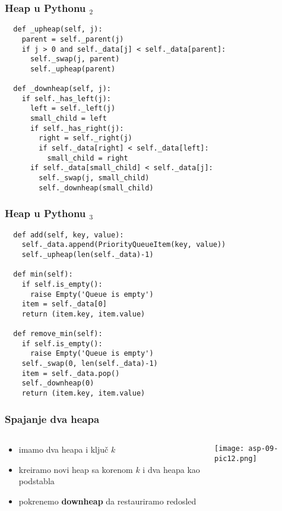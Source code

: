\documentclass[compress]{beamer}
\begin{document}
\begin{frame}
  \frametitle{Heap u Pythonu $_2$}
\begin{verbatim}
  def _upheap(self, j):
    parent = self._parent(j)
    if j > 0 and self._data[j] < self._data[parent]:
      self._swap(j, parent)
      self._upheap(parent)
  
  def _downheap(self, j):
    if self._has_left(j):
      left = self._left(j)
      small_child = left
      if self._has_right(j):
        right = self._right(j)
        if self._data[right] < self._data[left]:
          small_child = right
      if self._data[small_child] < self._data[j]:
        self._swap(j, small_child)
        self._downheap(small_child)
\end{verbatim}
\end{frame}

\begin{frame}
  \frametitle{Heap u Pythonu $_3$}
\begin{verbatim}
  def add(self, key, value):
    self._data.append(PriorityQueueItem(key, value))
    self._upheap(len(self._data)-1)
    
  def min(self):
    if self.is_empty():
      raise Empty('Queue is empty')
    item = self._data[0]
    return (item.key, item.value)
    
  def remove_min(self):
    if self.is_empty():
      raise Empty('Queue is empty')
    self._swap(0, len(self._data)-1)
    item = self._data.pop()
    self._downheap(0)
    return (item.key, item.value)  
\end{verbatim}
\end{frame}

\begin{frame}[fragile]
  \frametitle{Spajanje dva heapa}
  \begin{columns}
    \begin{column}[c]{6cm}
      \begin{itemize}
        \item imamo dva heapa i ključ $k$
        \item kreiramo novi heap sa korenom $k$ i dva heapa kao podstabla
        \item pokrenemo \textbf{downheap} da restauriramo redosled
      \end{itemize}
    \end{column}
    \begin{column}[c]{5cm}
      \begin{center}
        \texttt{[image: asp-09-pic12.png]}
      \end{center}
    \end{column}
  \end{columns}
\end{frame}
\end{document}
